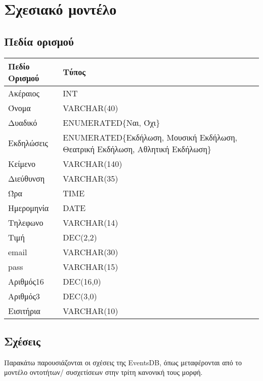 ﻿
\section{Σχεσιακό μοντέλο}

\subsection{Πεδία ορισμού}


\begin{tabular}{|p{6cm}|p{8cm}|}
\hline
  \textbf{Πεδίο Ορισμού} & \textbf{Τύπος}         \\ \hline
  Ακέραιος               & INT                    \\ \hline
  Όνομα                  & VARCHAR(40)            \\ \hline
  Δυαδικό                & ENUMERATED\{Ναι, Όχι\} \\ \hline
  Εκδηλώσεις             & ENUMERATED\{Εκδήλωση, Μουσική Εκδήλωση, Θεατρική
                  Εκδήλωση, Αθλητική Εκδήλωση\}   \\ \hline
  Κείμενο                & VARCHAR(140)           \\ \hline
  Διεύθυνση              & VARCHAR(35)            \\ \hline
  Ώρα                    & TIME                   \\ \hline
  Ημερομηνία             & DATE                   \\ \hline
  Τηλεφωνο               & VARCHAR(14)            \\ \hline
  Τιμή                   & DEC(2,2)               \\ \hline
  email                  & VARCHAR(30)            \\ \hline
  pass                   & VARCHAR(15)            \\ \hline
  Αριθμός16              & DEC(16,0)              \\ \hline
  Αριθμός3               & DEC(3,0)               \\ \hline
  Εισιτήρια              & VARCHAR(10)            \\ \hline
\end{tabular}

\subsection{Σχέσεις}

Παρακάτω παρουσιάζονται οι σχέσεις της EventsDB, όπως μεταφέρονται από
το μοντέλο οντοτήτων/ συσχετίσεων στην τρίτη κανονική τους μορφή.

